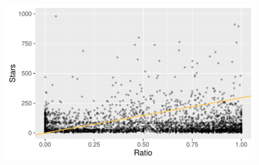 \begin{center}
	\includegraphics[page=1,scale=0.6]{../hypotheses/h3/ratio_subscriber_model_1.pdf}
	\label{fig:hyp3_m3.1}
\end{center}

